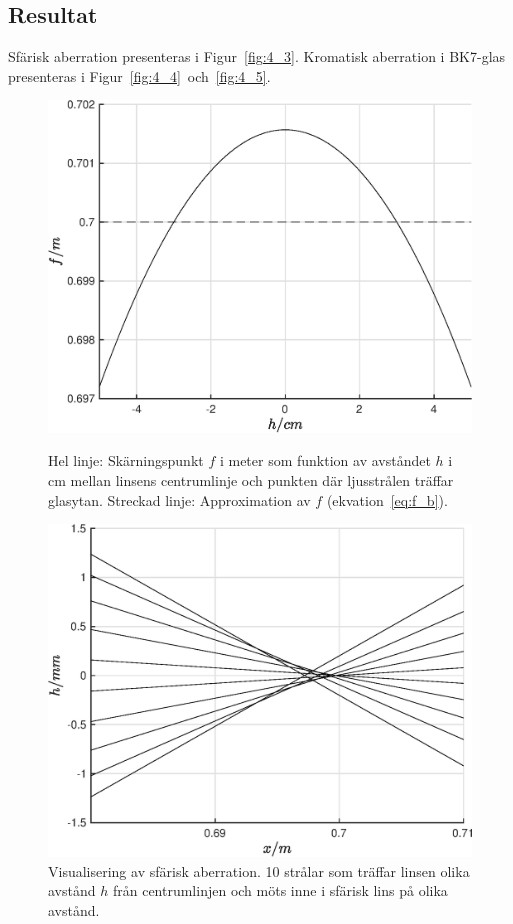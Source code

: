 \subsection*{Resultat}
Sfärisk aberration presenteras i Figur~\ref{fig:4_3}. Kromatisk aberration i BK7-glas presenteras i Figur~\ref{fig:4_4}~och~\ref{fig:4_5}.
\begin{figure}[H]
        \includegraphics[width=\linewidth]{Resources/Graphics/fig4_3.eps}
        \caption{Hel linje: Skärningspunkt $f$ i meter som funktion av avståndet $h$ i cm mellan linsens centrumlinje och punkten där ljusstrålen träffar glasytan. Streckad linje: Approximation av $f$ (ekvation~\ref{eq:f_b}).}\label{fig:4_3}
    \endminipage\hfill
        \includegraphics[width=\linewidth]{Resources/Graphics/fig4_3_2.eps}
        \caption{Visualisering av sfärisk aberration. 10 strålar som träffar linsen olika avstånd $h$ från centrumlinjen och möts inne i sfärisk lins på olika avstånd.}\label{fig:4_3_2}
    \endminipage
\end{figure}
